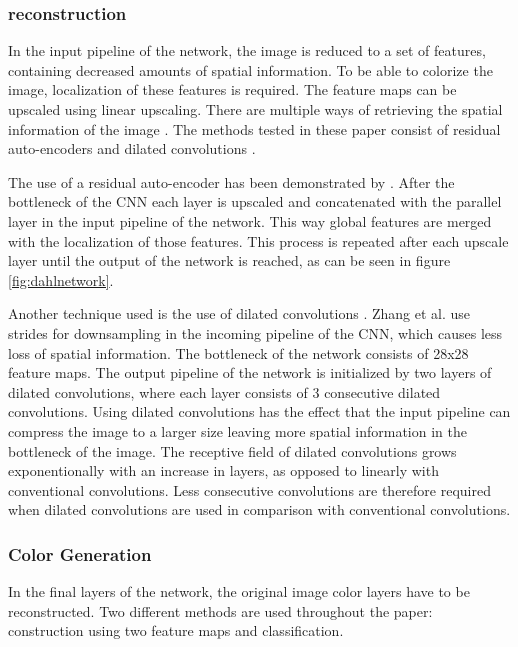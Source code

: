 \subsubsection{reconstruction}
In the input pipeline of the network, the image is reduced to a set of features, containing decreased amounts of spatial information. To be able to colorize the image, localization of these features is required. The feature maps can be upscaled using linear upscaling. There are multiple ways of retrieving the spatial information of the image \cite{Charpiat} \cite{Zhang}. The methods tested in these paper consist of residual auto-encoders and dilated convolutions \cite{yu2015multi}.

The use of a residual auto-encoder has been demonstrated by \cite{Dahl}. After the bottleneck of the CNN each layer is upscaled and concatenated with the parallel layer in the input pipeline of the network. This way global features are merged with the localization of those features. This process is repeated after each upscale layer until the output of the network is reached, as can be seen in figure \ref{fig:dahlnetwork}.

%
Another technique used is the use of dilated convolutions \cite{yu2015multi}. Zhang et al. use strides for downsampling in the incoming pipeline of the CNN, which causes less loss of spatial information. The bottleneck of the network consists of 28x28 feature maps. The output pipeline of the network is initialized by two layers of dilated convolutions, where each layer consists of 3 consecutive dilated convolutions. Using dilated convolutions has the effect that the input pipeline can compress the image to a larger size leaving more spatial information in the bottleneck of the image. The receptive field of dilated convolutions grows exponentionally with an increase in layers, as opposed to linearly with conventional convolutions. Less consecutive convolutions are therefore required when dilated convolutions are used in comparison with conventional convolutions.\\


\subsubsection{Color Generation}
In the final layers of the network, the original image color layers have to be reconstructed. Two different methods are used throughout the paper: construction using two feature maps and classification.

